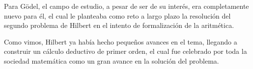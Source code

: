 Para Gödel, el campo de estudio, a pesar de ser de su interés, era completamente nuevo para él, el cual le planteaba como reto a largo plazo la resolución del segundo problema
de Hilbert en el intento de formalización de la aritmética. 

Como vimos, Hilbert ya había hecho pequeños avances en el tema, llegando a construir un cálculo deductivo de primer orden, el cual fue celebrado por toda la sociedad matemática 
como un gran avance en la solución del problema. 






\endinput
